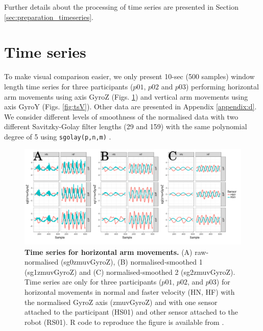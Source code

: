 Further details about the processing of time series are presented in
Section \ref{sec:preparation_timeseries}.

\section{Time series}
To make visual comparison easier, we only present 10-sec (500 samples) 
window length time series for three participants ($p01$, $p02$ and $p03$) 
performing horizontal 
arm movements using axis GyroZ (Figs. \ref{fig:tsH})
and  vertical arm movements using axis GyroY (Figs. \ref{fig:tsV}). 
Other data are presented in 
Appendix \ref{appendix:d}.
We consider different levels of smoothness of the normalised data 
with two different Savitzky-Golay filter lengths (29 and 159) 
with the same polynomial degree of 5 using \texttt{sgolay(p,n,m)} 
\citep{Rsignal}. 
\begin{figure}[!h]
  \centering
\includegraphics[width=1.0\textwidth]{tsHv03}
    	\caption{ 
	{\bf Time series for horizontal arm movements.}
		(A) raw-normalised (sg0zmuvGyroZ), 
		(B) normalised-smoothed 1 (sg1zmuvGyroZ) and
		(C) normalised-smoothed 2 (sg2zmuvGyroZ).
		Time series are only for three participants 
		($p01$, $p02$, and $p03$) 
		for horizontal movements in normal and faster velocity (HN, HF) 
		with the normalised GyroZ axis (zmuvGyroZ) 
		and with one sensor attached to the participant (HS01) 
		and other sensor attached to the robot (RS01).	
	R code to reproduce the figure is available from \cite{hwum2018}.
        }
    \label{fig:tsH}
\end{figure}
